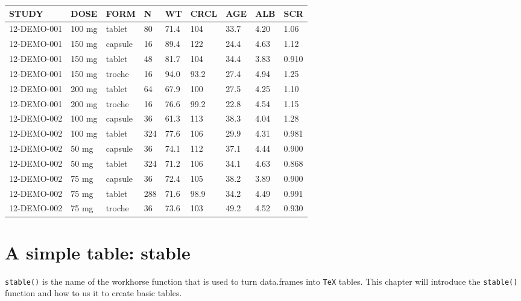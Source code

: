 \documentclass[
]{book}
\begin{document}
\begin{table}[H]
\centering
\setlength{\tabcolsep}{5pt} 
\begin{threeparttable}
\renewcommand{\arraystretch}{1.3}
\begin{tabular}[h]{lllllllll}
\hline
\textbf{STUDY} & \textbf{DOSE} & \textbf{FORM} & \textbf{N} & \textbf{WT} & \textbf{CRCL} & \textbf{AGE} & \textbf{ALB} & \textbf{SCR} \\
\hline
12-DEMO-001 & 100 mg & tablet & 80 & 71.4 & 104 & 33.7 & 4.20 & 1.06 \\
12-DEMO-001 & 150 mg & capsule & 16 & 89.4 & 122 & 24.4 & 4.63 & 1.12 \\
12-DEMO-001 & 150 mg & tablet & 48 & 81.7 & 104 & 34.4 & 3.83 & 0.910 \\
12-DEMO-001 & 150 mg & troche & 16 & 94.0 & 93.2 & 27.4 & 4.94 & 1.25 \\
12-DEMO-001 & 200 mg & tablet & 64 & 67.9 & 100 & 27.5 & 4.25 & 1.10 \\
12-DEMO-001 & 200 mg & troche & 16 & 76.6 & 99.2 & 22.8 & 4.54 & 1.15 \\
12-DEMO-002 & 100 mg & capsule & 36 & 61.3 & 113 & 38.3 & 4.04 & 1.28 \\
12-DEMO-002 & 100 mg & tablet & 324 & 77.6 & 106 & 29.9 & 4.31 & 0.981 \\
12-DEMO-002 & 50 mg & capsule & 36 & 74.1 & 112 & 37.1 & 4.44 & 0.900 \\
12-DEMO-002 & 50 mg & tablet & 324 & 71.2 & 106 & 34.1 & 4.63 & 0.868 \\
12-DEMO-002 & 75 mg & capsule & 36 & 72.4 & 105 & 38.2 & 3.89 & 0.900 \\
12-DEMO-002 & 75 mg & tablet & 288 & 71.6 & 98.9 & 34.2 & 4.49 & 0.991 \\
12-DEMO-002 & 75 mg & troche & 36 & 73.6 & 103 & 49.2 & 4.52 & 0.930 \\
\hline
\end{tabular}
\end{threeparttable}
\end{table}

\hypertarget{stable-intro}{%
\chapter{A simple table: stable}\label{stable-intro}}

\texttt{stable()} is the name of the workhorse function that is used to turn
data.frames into \texttt{TeX} tables. This chapter will introduce the \texttt{stable()} function and how to us it to create basic tables.
\end{document}
